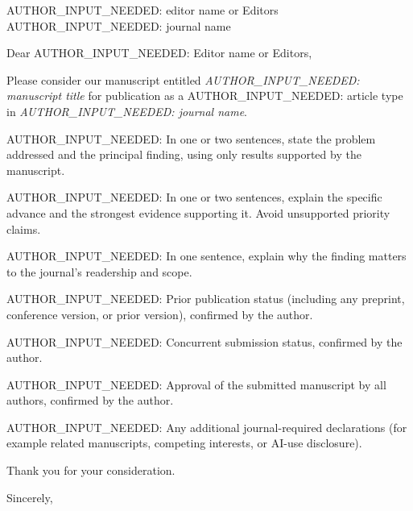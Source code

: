 \documentclass[11pt]{letter}
\date{\today}
\begin{document}
\begin{letter}{AUTHOR\_INPUT\_NEEDED: editor name or Editors\\
AUTHOR\_INPUT\_NEEDED: journal name}

\opening{Dear AUTHOR\_INPUT\_NEEDED: Editor name or Editors,}

Please consider our manuscript entitled
\emph{AUTHOR\_INPUT\_NEEDED: manuscript title}
for publication as a
AUTHOR\_INPUT\_NEEDED: article type
in \emph{AUTHOR\_INPUT\_NEEDED: journal name}.

AUTHOR\_INPUT\_NEEDED: In one or two sentences, state the problem addressed and
the principal finding, using only results supported by the manuscript.

AUTHOR\_INPUT\_NEEDED: In one or two sentences, explain the specific advance and
the strongest evidence supporting it. Avoid unsupported priority claims.

AUTHOR\_INPUT\_NEEDED: In one sentence, explain why the finding matters to the
journal's readership and scope.

AUTHOR\_INPUT\_NEEDED: Prior publication status (including any preprint, conference version, or prior version), confirmed by the author.

AUTHOR\_INPUT\_NEEDED: Concurrent submission status, confirmed by the author.

AUTHOR\_INPUT\_NEEDED: Approval of the submitted manuscript by all authors, confirmed by the author.

AUTHOR\_INPUT\_NEEDED: Any additional journal-required declarations (for example related manuscripts, competing interests, or AI-use disclosure).

Thank you for your consideration.

\closing{Sincerely,}

\end{letter}
\end{document}
